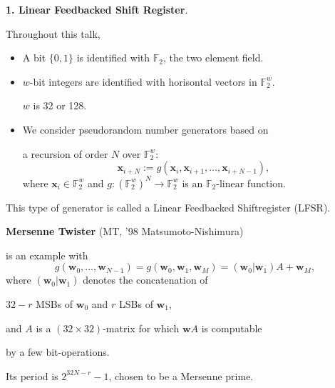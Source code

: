 \documentclass[a4j,12pt,landscape]{jarticle}
\def\F2{{\mathbb F}_2}
\def\bx{{{\mathbf x}}}
\def\bw{{{\mathbf w}}}
\begin{document}
\newpage
{\bf 1. Linear Feedbacked Shift Register}.

Throughout this talk,
\begin{itemize}
\item
A bit $\{0,1\}$ is identified with 
$\F2$, the two element field.

\item
$w$-bit integers are identified with 
horisontal vectors in $\F2^{w}$.

$w$ is 32 or 128.

\item
We consider pseudorandom number generators
based on 

a recursion of order $N$ over $\F2^{w}$:
$$
\bx_{i+N}:=g(\bx_i, \bx_{i+1}, \ldots, \bx_{i+N-1}),
$$
where $\bx_i \in \F2^{w}$ and 
$g:(\F2^{w})^N \to \F2^{w}$ is an $\F2$-linear function.
\end{itemize}
This type of generator is called a Linear Feedbacked 
Shiftregister (LFSR).

\newpage
{\bf Mersenne Twister} (MT, '98 Matsumoto-Nishimura)

is an example with
$$
g(\bw_0,\ldots,\bw_{N-1}) = g(\bw_0, \bw_1, \bw_M) = (\bw_0|\bw_1)A + \bw_M,
$$
where $(\bw_0|\bw_1)$ denotes
the concatenation of 
\begin{center}
$32-r$ MSBs of $\bw_0$ and $r$ LSBs of $\bw_1$,
\end{center}
and $A$ is a $(32\times 32)$-matrix 
for which $\bw A$ is computable 

by a few bit-operations.

Its period is $2^{32N-r}-1$, chosen to be a Mersenne prime.

\vskip 5mm
\end{document}
